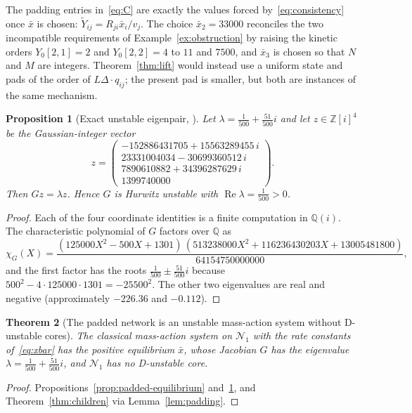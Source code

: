\documentclass[11pt,a4paper]{article}
\theoremstyle{plain}
\newtheorem{theorem}{Theorem}[section]
\newtheorem{proposition}[theorem]{Proposition}
\theoremstyle{definition}
\theoremstyle{remark}
\newcommand{\Q}{\mathbb{Q}}
\newcommand{\Z}{\mathbb{Z}}
\newcommand{\Real}{\operatorname{Re}}
\newcommand{\Ytil}{\widetilde{Y}}
\newcommand{\xbar}{\bar{x}}
\begin{document}
The padding entries in~\eqref{eq:C} are exactly the values forced by~\eqref{eq:consistency} once $\xbar$ is chosen: $\Ytil_{ij}=R_{ji}\xbar_i/v_j$. The choice $\xbar_2=33000$ reconciles the two incompatible requirements of Example~\ref{ex:obstruction} by raising the kinetic orders $Y_0[2,1]=2$ and $Y_0[2,2]=4$ to $11$ and $7500$, and $\xbar_3$ is chosen so that $N$ and $M$ are integers. Theorem~\ref{thm:lift} would instead use a uniform state and pads of the order of $L\Delta\cdot q_{ij}$; the present pad is smaller, but both are instances of the same mechanism.

\begin{proposition}[Exact unstable eigenpair, {\cite[Prop.~3.2]{Companion2026}}]\label{prop:eigenpair}
Let $\lambda=\frac1{500}+\frac{51}{500}i$ and let $z\in\Z[i]^4$ be the Gaussian-integer vector
\[
  z=\begin{pmatrix}-152886431705+15563289455\,i\\ 23331004034-30699360512\,i\\ 7890610882+34396287629\,i\\ 1399740000\end{pmatrix}.
\]
Then $Gz=\lambda z$. Hence $G$ is Hurwitz unstable with $\Real\lambda=\frac1{500}>0$.
\end{proposition}

\begin{proof}
Each of the four coordinate identities is a finite computation in $\Q(i)$. The characteristic polynomial of $G$ factors over $\Q$ as
\[
  \chi_G(X)=\frac{(125000X^2-500X+1301)\,(513238000X^2+116236430203X+13005481800)}{64154750000000},
\]
and the first factor has the roots $\frac1{500}\pm\frac{51}{500}i$ because $500^2-4\cdot125000\cdot1301=-25500^2$. The other two eigenvalues are real and negative (approximately $-226.36$ and $-0.112$).
\end{proof}

\begin{theorem}[The padded network is an unstable mass-action system without D-unstable cores]\label{thm:padded}
The classical mass-action system on $\mathcal N_1$ with the rate constants of~\eqref{eq:xbar} has the positive equilibrium $\xbar$, whose Jacobian $G$ has the eigenvalue $\lambda=\frac1{500}+\frac{51}{500}i$, and $\mathcal N_1$ has no D-unstable core.
\end{theorem}

\begin{proof}
Propositions~\ref{prop:padded-equilibrium} and~\ref{prop:eigenpair}, and Theorem~\ref{thm:children} via Lemma~\ref{lem:padding}.
\end{proof}
\end{document}
